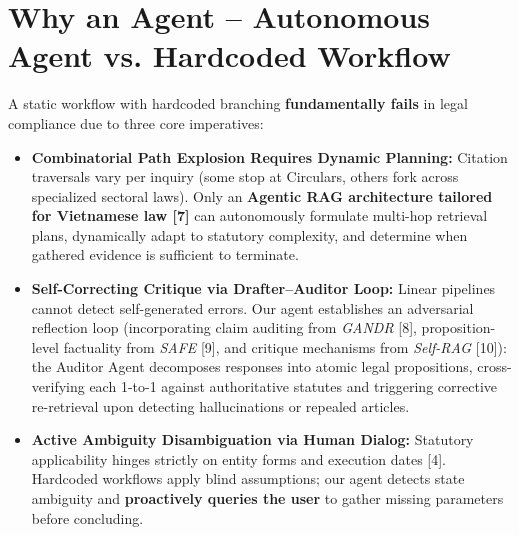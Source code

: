\documentclass[10pt,a4paper]{article}
\begin{document}
\section{Why an Agent -- Autonomous Agent vs. Hardcoded Workflow}
A static workflow with hardcoded branching \textbf{fundamentally fails} in legal compliance due to three core imperatives:
\begin{itemize}
  \item \textbf{Combinatorial Path Explosion Requires Dynamic Planning:} Citation traversals vary per inquiry (some stop at Circulars, others fork across specialized sectoral laws). Only an \textbf{Agentic RAG architecture tailored for Vietnamese law [7]} can autonomously formulate multi-hop retrieval plans, dynamically adapt to statutory complexity, and determine when gathered evidence is sufficient to terminate.
  \item \textbf{Self-Correcting Critique via Drafter--Auditor Loop:} Linear pipelines cannot detect self-generated errors. Our agent establishes an adversarial reflection loop (incorporating claim auditing from \textit{GANDR} [8], proposition-level factuality from \textit{SAFE} [9], and critique mechanisms from \textit{Self-RAG} [10]): the Auditor Agent decomposes responses into atomic legal propositions, cross-verifying each 1-to-1 against authoritative statutes and triggering corrective re-retrieval upon detecting hallucinations or repealed articles.
  \item \textbf{Active Ambiguity Disambiguation via Human Dialog:} Statutory applicability hinges strictly on entity forms and execution dates [4]. Hardcoded workflows apply blind assumptions; our agent detects state ambiguity and \textbf{proactively queries the user} to gather missing parameters before concluding.
\end{itemize}

\end{document}
